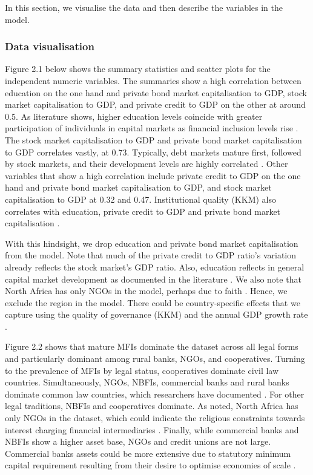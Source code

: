 \documentclass[a4paper, nobind]{templates/ociamthesis}
\begin{document}
In this section, we visualise the data and then describe the variables in the model.

\hypertarget{data-visualisation}{%
\subsubsection{Data visualisation}\label{data-visualisation}}

Figure 2.1 below shows the summary statistics and scatter plots for the independent numeric variables. The summaries show a high correlation between education on the one hand and private bond market capitalisation to GDP, stock market capitalisation to GDP, and private credit to GDP on the other at around 0.5. As literature shows, higher education levels coincide with greater participation of individuals in capital markets as financial inclusion levels rise \autocite{allen2013resolving,allen2014african,ito2018quantity}. The stock market capitalisation to GDP and private bond market capitalisation to GDP correlates vastly, at 0.73. Typically, debt markets mature first, followed by stock markets, and their development levels are highly correlated \autocite{levine1999stock}. Other variables that show a high correlation include private credit to GDP on the one hand and private bond market capitalisation to GDP, and stock market capitalisation to GDP at 0.32 and 0.47. Institutional quality (KKM) also correlates with education, private credit to GDP and private bond market capitalisation \autocite{yartey2008determinants}.

With this hindsight, we drop education and private bond market capitalisation from the model. Note that much of the private credit to GDP ratio's variation already reflects the stock market's GDP ratio. Also, education reflects in general capital market development as documented in the literature \autocite{allen2013resolving,allen2014african}. We also note that North Africa has only NGOs in the model, perhaps due to faith \autocite{allen2013resolving,allen2014african,hassan2018religious}. Hence, we exclude the region in the model. There could be country-specific effects that we capture using the quality of governance (KKM) \autocite{kunvcivc2014institutional} and the annual GDP growth rate \autocite{butkiewicz2006institutional}.

Figure 2.2 shows that mature MFIs dominate the dataset across all legal forms and particularly dominant among rural banks, NGOs, and cooperatives. Turning to the prevalence of MFIs by legal status, cooperatives dominate civil law countries. Simultaneously, NGOs, NBFIs, commercial banks and rural banks dominate common law countries, which researchers have documented \autocite{pashkova2016business}. For other legal traditions, NBFIs and cooperatives dominate. As noted, North Africa has only NGOs in the dataset, which could indicate the religious constraints towards interest charging financial intermediaries \autocite{hassan2018religious}. Finally, while commercial banks and NBFIs show a higher asset base, NGOs and credit unions are not large. Commercial banks assets could be more extensive due to statutory minimum capital requirement resulting from their desire to optimise economies of scale \autocite{aiyar2016does}.
\end{document}
